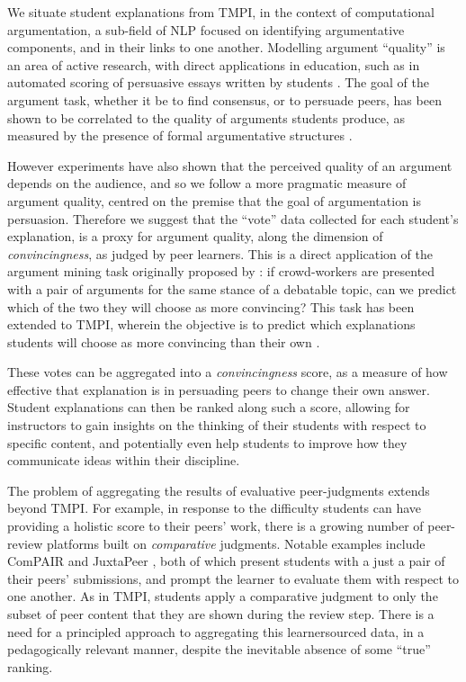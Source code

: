 \documentclass[notitlepage,12pt]{jedm}
\begin{document}
We situate student explanations from TMPI, in the context of computational 
argumentation, a sub-field of NLP focused on identifying argumentative 
components, and in their links to one another.
Modelling argument ``quality'' is an area of active research, with direct 
applications in education, such as in automated scoring of 
persuasive essays written by students \cite{persing_modeling_2015} 
\cite{nguyen_argument_2018}.
The goal of the argument task, whether it be to find 
consensus, or to persuade peers, has been shown to be correlated to the quality 
of arguments students produce, as measured by the presence of formal 
argumentative structures \cite{garcia-mila_effect_2013}.

However experiments have also shown that the perceived quality of an argument 
depends on the audience, and so we follow a more pragmatic measure of argument 
quality, centred on the premise that the goal of argumentation is 
persuasion\cite{mercier_why_2011}.
Therefore we suggest that the ``vote'' data collected for each student's 
explanation, is a proxy for argument quality, along the dimension of 
\textit{convincingness}, as judged by peer learners. 
This is a direct application of the argument mining task originally proposed by 
\cite{habernal_which_2016}: if crowd-workers are presented with a pair of 
arguments for the same stance of a debatable topic, can we predict which of the 
two they will choose as more convincing?
This task has been extended to TMPI, wherein the objective is to predict which 
explanations students will choose as more convincing than their own 
\cite{bhatnagar_learnersourcing_2020}.

These votes can be aggregated into a \textit{convincingness} score, as a 
measure of how effective that explanation is in persuading peers to change 
their own answer.
Student explanations can then be ranked along such a score, allowing for 
instructors to gain insights on the thinking of their students with respect to 
specific content, and potentially even help students to improve how they 
communicate ideas within their discipline.

The problem of aggregating the results of evaluative peer-judgments extends  
beyond TMPI.
For example, in response to the difficulty students can have providing a 
holistic score to their peers' work, there is a growing number of peer-review 
platforms built on \textit{comparative} judgments.
Notable examples include ComPAIR \cite{potter_compair:_2017} and 
JuxtaPeer \cite{cambre_juxtapeer:_2018}, both of which present students with a 
just a pair of their peers' submissions, and prompt the learner to evaluate 
them with respect to one another.
As in TMPI, students apply a comparative judgment to only the subset of peer 
content that they are shown during the review step.
There is a need for a principled approach to aggregating this learnersourced 
data, in a pedagogically relevant manner, despite the inevitable absence of 
some ``true'' ranking.
\end{document}
